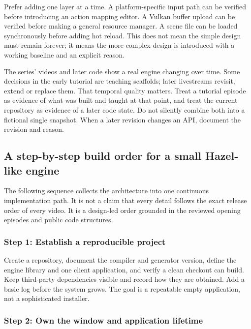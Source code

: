 Prefer adding one layer at a time. A platform-specific input path can be verified before introducing an action mapping editor. A Vulkan buffer upload can be verified before making a general resource manager. A scene file can be loaded synchronously before adding hot reload. This does not mean the simple design must remain forever; it means the more complex design is introduced with a working baseline and an explicit reason.

The series' videos and later code show a real engine changing over time. Some decisions in the early tutorial are teaching scaffolds; later livestreams revisit, extend or replace them. That temporal quality matters. Treat a tutorial episode as evidence of what was built and taught at that point, and treat the current repository as evidence of a later code state. Do not silently combine both into a fictional single snapshot. When a later revision changes an API, document the revision and reason.

\subsection{A step-by-step build order for a small Hazel-like engine}\label{06-engine-ii-ch042-a-step-by-step-build-order-for-a-small-hazel-like-engine}

The following sequence collects the architecture into one continuous implementation path. It is not a claim that every detail follows the exact release order of every video. It is a design-led order grounded in the reviewed opening episodes and public code structures.

\subsubsection{Step 1: Establish a reproducible project}\label{06-engine-ii-ch042-step-1-establish-a-reproducible-project}

Create a repository, document the compiler and generator version, define the engine library and one client application, and verify a clean checkout can build. Keep third-party dependencies visible and record how they are obtained. Add a basic log before the system grows. The goal is a repeatable empty application, not a sophisticated installer.

\subsubsection{Step 2: Own the window and application lifetime}\label{06-engine-ii-ch042-step-2-own-the-window-and-application-lifetime}

